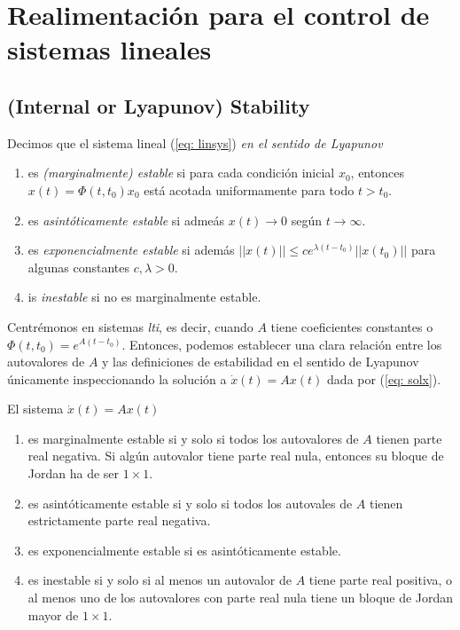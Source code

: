 \chapter{Realimentación para el control de sistemas lineales}

\section{(Internal or Lyapunov) Stability}
\label{sec: sta}

Decimos que el sistema lineal (\ref{eq: linsys}) \emph{en el sentido de Lyapunov}
\begin{enumerate}
	\item es \emph{(marginalmente) estable} si para cada condición inicial $x_0$, entonces $x(t) = \Phi(t,t_0) x_0$ está acotada uniformamente para todo $t>t_0$.
	\item es \emph{asintóticamente estable} si admeás $x(t) \to 0$ según $t\to\infty$.
	\item es \emph{exponencialmente estable} si además $||x(t)|| \leq c e^{\lambda(t-t_0)}||x(t_0)||$ para algunas constantes $c,\lambda > 0$.
	\item is \emph{inestable} si no es marginalmente estable.
\end{enumerate}


Centrémonos en sistemas \emph{lti}, es decir, cuando $A$ tiene coeficientes constantes o $\Phi(t,t_0) = e^{A(t-t_0)}$. Entonces, podemos establecer una clara relación entre los autovalores de $A$ y las definiciones de estabilidad en el sentido de Lyapunov únicamente inspeccionando la solución a $\dot x(t) = Ax(t)$ dada por (\ref{eq: solx}).

El sistema $\dot x(t) = Ax(t)$
\begin{enumerate}
	\item es marginalmente estable si y solo si todos los autovalores de $A$ tienen parte real negativa. Si algún autovalor tiene parte real nula, entonces su bloque de Jordan ha de ser $1\times 1$.
	\item es asintóticamente estable si y solo si todos los autovales de $A$ tienen estrictamente parte real negativa.
	\item es exponencialmente estable si es asintóticamente estable.
	\item es inestable si y solo si al menos un autovalor de $A$ tiene parte real positiva, o al menos uno de los autovalores con parte real nula tiene un bloque de Jordan mayor de $1\times 1$.
\end{enumerate}

